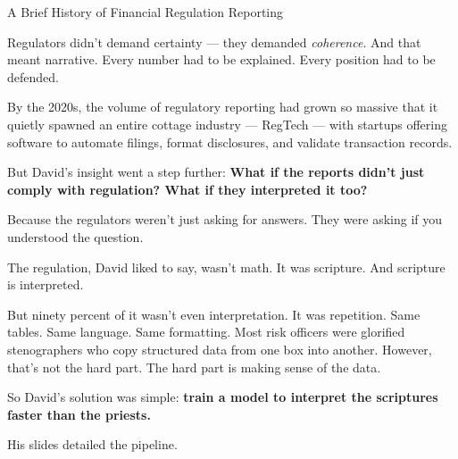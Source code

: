 \begin{HistoricalSidebar}{A Brief History of Financial Regulation Reporting}
    \medskip
    
    Regulators didn’t demand certainty — they demanded \textit{coherence}. And that meant narrative. Every 
    number had to be explained. Every position had to be defended.
    
    \medskip
    
    By the 2020s, the volume of regulatory reporting had grown so massive that it quietly spawned an entire 
    cottage industry — RegTech — with startups offering software to automate filings, format disclosures, and 
    validate transaction records.
    
    \medskip
    
    But David’s insight went a step further:
    \textbf{What if the reports didn’t just comply with regulation? What if they interpreted it too?}

    \medskip
    
    Because the regulators weren’t just asking for answers.
    They were asking if you understood the question.

\end{HistoricalSidebar}

\medskip

The regulation, David liked to say, wasn’t math. It was scripture.
And scripture is interpreted.

But ninety percent of it wasn’t even interpretation. It was repetition.
Same tables. Same language. Same formatting.
Most risk officers were glorified stenographers who copy structured data from one box into another.
However, that's not the hard part. The hard part is making sense of the data.

So David's solution was simple:
\textbf{train a model to interpret the scriptures faster than the priests.}

His slides detailed the pipeline.

\medskip

